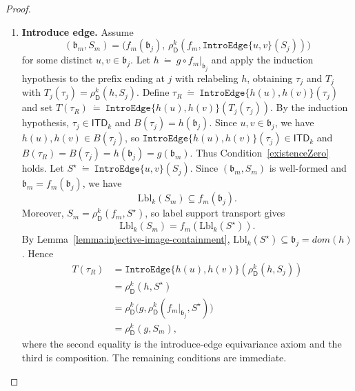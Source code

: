 \documentclass[11pt,a4paper]{article}
\newcommand{\treewidthvalue}{k}
\newcommand{\abag}{\mathfrak{b}}
\newcommand{\introedgegeneric}[2]{\mathtt{IntroEdge}\{#1,#2\}}
\newcommand{\topbagname}{B}
\newcommand{\topbag}[1]{\topbagname(#1)}
\newcommand{\allabstractdecompositionstreewidth}[1]{\mathsf{ITD}_{#1}}
\newcommand{\abstractdecomposition}{\tau}
\newcommand{\defeq}{~\dot{=}~}
\newcommand{\vertexone}{u}
\newcommand{\vertextwo}{v}
\newcommand{\dpcore}{\mathsf{D}}
\newcommand{\witnessset}{S}
\newcommand{\domain}{dom}
\newcommand{\dprefutation}{R}
\newcommand{\subtermToBag}{T}
\newcommand{\relabelingfunction}{f}
\newcommand{\action}{\rho}
\begin{document}
\begin{proof}
\begin{enumerate}
\item \textbf{Introduce edge.}
Assume
\[
(\abag_m,\witnessset_m)
=
\bigl(\relabelingfunction_m(\abag_j),\,\action_{\dpcore}^{\treewidthvalue}(\relabelingfunction_m,\introedgegeneric{\vertexone}{\vertextwo}(\witnessset_j))\bigr)
\]
for some distinct $\vertexone,\vertextwo\in \abag_j$.
Let $h\defeq g\circ \relabelingfunction_m|_{\abag_j}$ and apply the induction hypothesis to the prefix ending at $j$ with relabeling $h$, obtaining $\abstractdecomposition_j$ and $\subtermToBag_j$ with $\subtermToBag_j(\abstractdecomposition_j)=\action_{\dpcore}^{\treewidthvalue}(h,\witnessset_j)$.
Define $\abstractdecomposition_{\dprefutation}\defeq \introedgegeneric{h(\vertexone)}{h(\vertextwo)}(\abstractdecomposition_j)$ and set $\subtermToBag(\abstractdecomposition_{\dprefutation})\defeq \introedgegeneric{h(\vertexone)}{h(\vertextwo)}(\subtermToBag_j(\abstractdecomposition_j))$.
By the induction hypothesis, $\abstractdecomposition_j\in \allabstractdecompositionstreewidth{\treewidthvalue}$ and $\topbag{\abstractdecomposition_j}=h(\abag_j)$.
Since $\vertexone,\vertextwo\in \abag_j$, we have $h(\vertexone),h(\vertextwo)\in \topbag{\abstractdecomposition_j}$, so $\introedgegeneric{h(\vertexone)}{h(\vertextwo)}(\abstractdecomposition_j)\in \allabstractdecompositionstreewidth{\treewidthvalue}$ and $\topbag{\abstractdecomposition_{\dprefutation}}=\topbag{\abstractdecomposition_j}=h(\abag_j)=g(\abag_m)$.
Thus Condition~\ref{existenceZero} holds.
Let $S^\star\defeq \introedgegeneric{\vertexone}{\vertextwo}(\witnessset_j)$.
Since $(\abag_m,\witnessset_m)$ is well-formed and $\abag_m=\relabelingfunction_m(\abag_j)$, we have
\[
\mathrm{Lbl}_{\treewidthvalue}(\witnessset_m)\subseteq \relabelingfunction_m(\abag_j).
\]
Moreover, $\witnessset_m=\action_{\dpcore}^{\treewidthvalue}(\relabelingfunction_m,S^\star)$, so label support transport gives
\[
\mathrm{Lbl}_{\treewidthvalue}(\witnessset_m)=\relabelingfunction_m(\mathrm{Lbl}_{\treewidthvalue}(S^\star)).
\]
By Lemma~\ref{lemma:injective-image-containment}, $\mathrm{Lbl}_{\treewidthvalue}(S^\star)\subseteq \abag_j=\domain(h)$.
Hence
\[
\begin{aligned}
\subtermToBag(\abstractdecomposition_{\dprefutation})
&= \introedgegeneric{h(\vertexone)}{h(\vertextwo)}(\action_{\dpcore}^{\treewidthvalue}(h,\witnessset_j))\\
&= \action_{\dpcore}^{\treewidthvalue}(h,S^\star)\\
&= \action_{\dpcore}^{\treewidthvalue}\bigl(g,\action_{\dpcore}^{\treewidthvalue}(\relabelingfunction_m|_{\abag_j},S^\star)\bigr)\\
&= \action_{\dpcore}^{\treewidthvalue}(g,\witnessset_m),
\end{aligned}
\]
where the second equality is the introduce-edge equivariance axiom and the third is composition. The remaining conditions are immediate.


\end{enumerate}
\end{proof}
\end{document}
